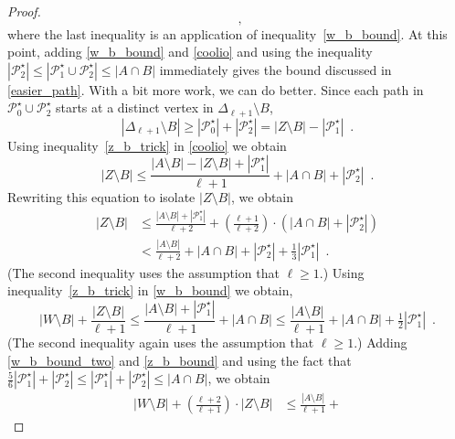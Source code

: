 \documentclass{patmorin}
\begin{document}
\begin{proof}
\begin{equation}
     \enspace , \label{coolio}
  \end{equation}
  where the last inequality is an application of inequality~\eqref{w_b_bound}.  At this point, adding \eqref{w_b_bound} and \eqref{coolio} and using the inequality $|\mathcal{P}_2^\star| \le |\mathcal{P}_1^\star\cup\mathcal{P}_2^\star|\le |A\cap B|$ immediately gives the bound discussed in \cref{easier_path}.  With a bit more work, we can do better.  Since each path in $\mathcal{P}_0^\star\cup\mathcal{P}^\star_2$ starts at a distinct vertex in $\Delta_{\ell+1}\setminus B$,
  \begin{equation}
      |\Delta_{\ell+1}\setminus B|\ge |\mathcal{P}_0^\star|+|\mathcal{P}^\star_2|=|Z\setminus B|-|\mathcal{P}_1^\star| \enspace . \label{z_b_trick}
  \end{equation}
  Using inequality~\eqref{z_b_trick}  in \cref{coolio} we obtain
  \[
     |Z\setminus B| \le \frac{|A\setminus B|-|Z\setminus B|+|\mathcal{P}_1^\star|}{\ell+1}+|A\cap B|+|\mathcal{P}_2^\star| \enspace .
  \]
  Rewriting this equation to isolate $|Z\setminus B|$, we obtain
  \begin{align}
     |Z\setminus B|
      & \le \frac{|A\setminus B|+|\mathcal{P}_1^\star|}{\ell+2} + \left(\frac{\ell+1}{\ell+2}\right)\cdot
        \left(|A\cap B|+|\mathcal{P}_2^\star|\right) \\
      & < \frac{|A\setminus B|}{\ell+2} +
        |A\cap B|+|\mathcal{P}_2^\star|+\tfrac{1}{3} |\mathcal{P}_1^\star|
        \enspace . \label{z_b_bound}
  \end{align}
  (The second inequality uses the assumption that $\ell\ge 1$.) Using inequality~\eqref{z_b_trick}  in \cref{w_b_bound} we obtain,
  \begin{equation}
      |W\setminus B|+\frac{|Z\setminus B|}{\ell+1}\le \frac{|A\setminus B|+|\mathcal{P}_1^\star|}{\ell+1} + |A\cap B|
      \le \frac{|A\setminus B|}{\ell+1} + |A\cap B| +\tfrac{1}{2}|\mathcal{P}_1^\star| \enspace .  \label{w_b_bound_two}
  \end{equation}
  (The second inequality again uses the assumption that $\ell\ge 1$.) Adding \eqref{w_b_bound_two} and \eqref{z_b_bound} and using the fact that $\tfrac{5}{6}|\mathcal{P}_1^\star|+|\mathcal{P}_2^\star|\le|\mathcal{P}_1^\star|+|\mathcal{P}_2^\star|\le |A\cap B|$, we obtain
  \begin{align}
    |W\setminus B| + \left(\frac{\ell+2}{\ell+1}\right)\cdot|Z\setminus B|
    & \le \frac{|A\setminus B|}{\ell+1} +

\end{align}
\end{proof}
\end{document}
